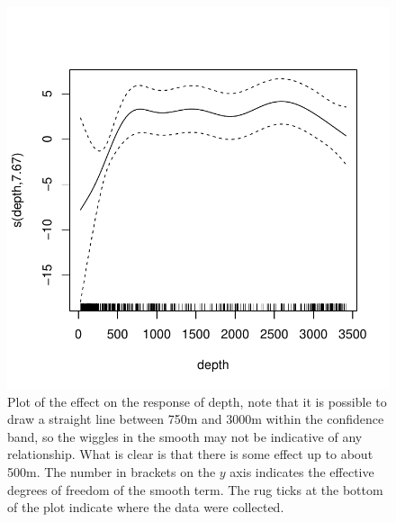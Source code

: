 \documentclass[a4paper,12pt]{article}
\begin{document}
\begin{figure}[h!]
  \caption{Plot of the effect on the response of depth, note that it is possible to draw a straight line between 750m and 3000m within the confidence band, so the wiggles in the smooth may not be indicative of any relationship. What is clear is that there is some effect up to about 500m. The number in brackets on the $y$ axis indicates the effective degrees of freedom of the smooth term. The rug ticks at the bottom of the plot indicate where the data were collected.}
  \label{depth-gamplot}
  \begin{center}
    \includegraphics[width=\textwidth]{figs/fit-depth-gam}
  \end{center}
\end{figure}

\newpage
\end{document}
